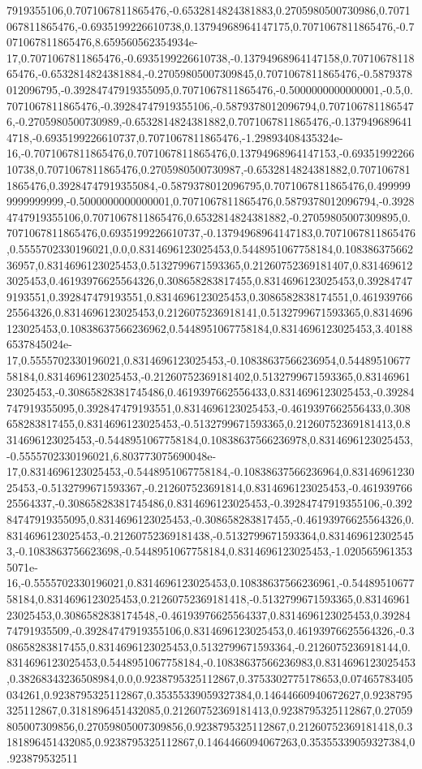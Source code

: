 7919355106,0.7071067811865476,-0.6532814824381883,0.2705980500730986,0.7071067811865476,-0.6935199226610738,0.13794968964147175,0.7071067811865476,-0.7071067811865476,8.659560562354934e-17,0.7071067811865476,-0.6935199226610738,-0.13794968964147158,0.7071067811865476,-0.6532814824381884,-0.27059805007309845,0.7071067811865476,-0.5879378012096795,-0.39284747919355095,0.7071067811865476,-0.5000000000000001,-0.5,0.7071067811865476,-0.39284747919355106,-0.5879378012096794,0.7071067811865476,-0.2705980500730989,-0.6532814824381882,0.7071067811865476,-0.1379496896414718,-0.6935199226610737,0.7071067811865476,-1.29893408435324e-16,-0.7071067811865476,0.7071067811865476,0.13794968964147153,-0.6935199226610738,0.7071067811865476,0.2705980500730987,-0.6532814824381882,0.7071067811865476,0.39284747919355084,-0.5879378012096795,0.7071067811865476,0.4999999999999999,-0.5000000000000001,0.7071067811865476,0.5879378012096794,-0.39284747919355106,0.7071067811865476,0.6532814824381882,-0.27059805007309895,0.7071067811865476,0.6935199226610737,-0.13794968964147183,0.7071067811865476,0.5555702330196021,0.0,0.8314696123025453,0.5448951067758184,0.10838637566236957,0.8314696123025453,0.5132799671593365,0.21260752369181407,0.8314696123025453,0.46193976625564326,0.308658283817455,0.8314696123025453,0.392847479193551,0.392847479193551,0.8314696123025453,0.3086582838174551,0.46193976625564326,0.8314696123025453,0.2126075236918141,0.5132799671593365,0.8314696123025453,0.10838637566236962,0.5448951067758184,0.8314696123025453,3.401886537845024e-17,0.5555702330196021,0.8314696123025453,-0.10838637566236954,0.5448951067758184,0.8314696123025453,-0.21260752369181402,0.5132799671593365,0.8314696123025453,-0.30865828381745486,0.4619397662556433,0.8314696123025453,-0.39284747919355095,0.392847479193551,0.8314696123025453,-0.4619397662556433,0.308658283817455,0.8314696123025453,-0.5132799671593365,0.21260752369181413,0.8314696123025453,-0.5448951067758184,0.10838637566236978,0.8314696123025453,-0.5555702330196021,6.803773075690048e-17,0.8314696123025453,-0.5448951067758184,-0.10838637566236964,0.8314696123025453,-0.5132799671593367,-0.212607523691814,0.8314696123025453,-0.46193976625564337,-0.30865828381745486,0.8314696123025453,-0.39284747919355106,-0.39284747919355095,0.8314696123025453,-0.308658283817455,-0.46193976625564326,0.8314696123025453,-0.21260752369181438,-0.5132799671593364,0.8314696123025453,-0.1083863756623698,-0.5448951067758184,0.8314696123025453,-1.0205659613535071e-16,-0.5555702330196021,0.8314696123025453,0.10838637566236961,-0.5448951067758184,0.8314696123025453,0.21260752369181418,-0.5132799671593365,0.8314696123025453,0.3086582838174548,-0.46193976625564337,0.8314696123025453,0.3928474791935509,-0.39284747919355106,0.8314696123025453,0.46193976625564326,-0.308658283817455,0.8314696123025453,0.5132799671593364,-0.2126075236918144,0.8314696123025453,0.5448951067758184,-0.10838637566236983,0.8314696123025453,0.38268343236508984,0.0,0.9238795325112867,0.3753302775178653,0.07465783405034261,0.9238795325112867,0.35355339059327384,0.14644660940672627,0.9238795325112867,0.3181896451432085,0.21260752369181413,0.9238795325112867,0.27059805007309856,0.27059805007309856,0.9238795325112867,0.21260752369181418,0.3181896451432085,0.9238795325112867,0.1464466094067263,0.35355339059327384,0.923879532511